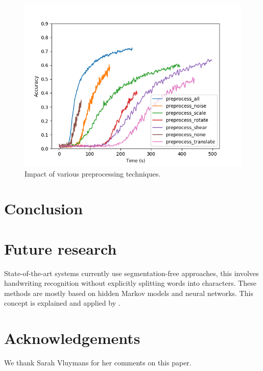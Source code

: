 \documentclass{article}
\begin{document}
\begin{figure}
\centering
    \includegraphics[width=\linewidth]{../Graphs/preprocess.png}
    \caption{Impact of various preprocessing techniques.}
    \label{fig:preprocess}
\end{figure}

\section{Conclusion}

\section{Future research}
State-of-the-art systems currently use segmentation-free approaches, this involves handwriting recognition without explicitly splitting words into characters. These methods are mostly based on hidden Markov models and neural networks. This concept is explained and applied by \cite{presham}.
\section{Acknowledgements}
We thank Sarah Vluymans for her comments on this paper.


\end{document}
